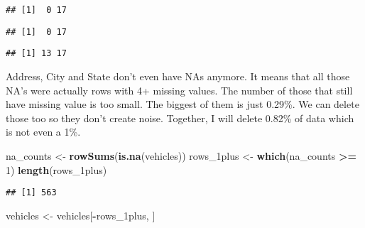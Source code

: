 \documentclass[
]{article}
\newenvironment{Shaded}{\begin{snugshade}}{\end{snugshade}}
\newcommand{\DecValTok}[1]{\textcolor[rgb]{0.00,0.00,0.81}{#1}}
\newcommand{\FunctionTok}[1]{\textcolor[rgb]{0.13,0.29,0.53}{\textbf{#1}}}
\newcommand{\NormalTok}[1]{#1}
\newcommand{\OtherTok}[1]{\textcolor[rgb]{0.56,0.35,0.01}{#1}}
\newcommand{\SpecialCharTok}[1]{\textcolor[rgb]{0.81,0.36,0.00}{\textbf{#1}}}
\begin{document}
\begin{verbatim}
## [1]  0 17
\end{verbatim}

\begin{Shaded}
\end{Shaded}

\begin{verbatim}
## [1]  0 17
\end{verbatim}

\begin{Shaded}
\end{Shaded}

\begin{verbatim}
## [1] 13 17
\end{verbatim}

Address, City and State don't even have NAs anymore. It means that all
those NA's were actually rows with 4+ missing values. The number of
those that still have missing value is too small. The biggest of them is
just 0.29\%. We can delete those too so they don't create noise.
Together, I will delete 0.82\% of data which is not even a 1\%.

\begin{Shaded}
\begin{Highlighting}[]
\NormalTok{na\_counts }\OtherTok{\textless{}{-}} \FunctionTok{rowSums}\NormalTok{(}\FunctionTok{is.na}\NormalTok{(vehicles))}
\NormalTok{rows\_1plus }\OtherTok{\textless{}{-}} \FunctionTok{which}\NormalTok{(na\_counts }\SpecialCharTok{\textgreater{}=} \DecValTok{1}\NormalTok{)}
\FunctionTok{length}\NormalTok{(rows\_1plus)   }
\end{Highlighting}
\end{Shaded}

\begin{verbatim}
## [1] 563
\end{verbatim}

\begin{Shaded}
\begin{Highlighting}[]
\NormalTok{vehicles }\OtherTok{\textless{}{-}}\NormalTok{ vehicles[}\SpecialCharTok{{-}}\NormalTok{rows\_1plus, ]}
\end{Highlighting}
\end{Shaded}
\end{document}
